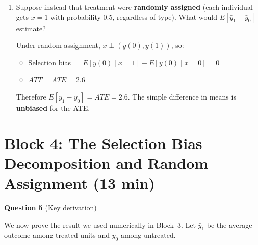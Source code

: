 \documentclass[11pt,a4paper]{article}
\begin{document}
\begin{enumerate}[label=(\alph*)]
\begin{solution}
\textbf{Right side:} $ATT + \text{Sel.\ Bias} = 3 + (-2) = 1$. \checkmark

The naive comparison ($\bar{y}_1 - \bar{y}_0 = 1$) \emph{understates} the true ATT of 3 because of negative selection bias.
\end{solution}

\item Suppose instead that treatment were \textbf{randomly assigned} (each individual gets $x=1$ with probability 0.5, regardless of type). What would $E[\bar{y}_1 - \bar{y}_0]$ estimate?

\begin{solution}
Under random assignment, $x \perp (y(0), y(1))$, so:
\begin{itemize}
  \item Selection bias $= E[y(0) \mid x{=}1] - E[y(0) \mid x{=}0] = 0$
  \item $ATT = ATE = 2.6$
\end{itemize}
Therefore $E[\bar{y}_1 - \bar{y}_0] = ATE = 2.6$. The simple difference in means is \textbf{unbiased} for the ATE.
\end{solution}
\end{enumerate}

\section{Block 4: The Selection Bias Decomposition and Random Assignment \textnormal{(13 min)}}

\textbf{Question 5} (Key derivation)

\medskip
We now prove the result we used numerically in Block~3. Let $\bar{y}_1$ be the average outcome among treated units and $\bar{y}_0$ among untreated.
\end{document}
